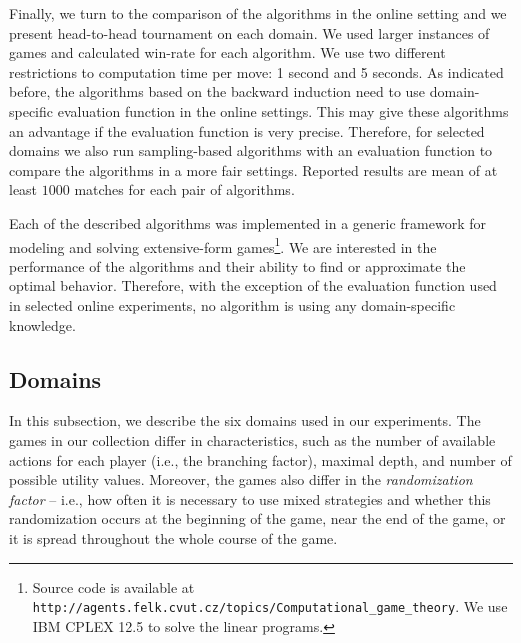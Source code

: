 Finally, we turn to the comparison of the algorithms in the online setting and we present head-to-head tournament on each domain.
We used larger instances of games and calculated win-rate for each algorithm.
We use two different restrictions to computation time per move: 1 second and 5 seconds. 
As indicated before, the algorithms based on the backward induction need to use domain-specific evaluation function in the online settings.
This may give these algorithms an advantage if the evaluation function is very precise.
Therefore, for selected domains we also run sampling-based algorithms with an evaluation function to compare the algorithms in a more fair settings.
Reported results are mean of at least $1000$ matches for each pair of algorithms.

Each of the described algorithms was implemented in a generic framework for modeling and solving extensive-form games\footnote{Source code is available at \texttt{http://agents.felk.cvut.cz/topics/Computational\_\newline game\_theory}. We use IBM CPLEX 12.5 to solve the linear programs.}.
We are interested in the performance of the algorithms and their ability to find or approximate the optimal behavior.
Therefore, with the exception of the evaluation function used in selected online experiments, no algorithm is using any domain-specific knowledge.


\subsection{Domains}\label{sec:eval:domains}

In this subsection, we describe the six domains used in our experiments.
The games in our collection differ in characteristics, such as the number of available actions for each player (i.e., the branching factor), maximal depth, and number of possible utility values.
Moreover, the games also differ in the \emph{randomization factor} -- i.e., how often it is necessary to use mixed strategies and whether this randomization occurs at the beginning of the game, near the end of the game, or it is spread throughout the whole course of the game.

